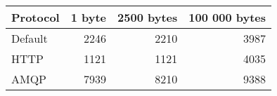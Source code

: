 \begin{tabular}{lrrr}
\hline
 Protocol   &   1 byte &   2500 bytes &   100 000 bytes \\
\hline
 Default    &     2246 &         2210 &            3987 \\
 HTTP       &     1121 &         1121 &            4035 \\
 AMQP       &     7939 &         8210 &            9388 \\
\hline
\end{tabular}